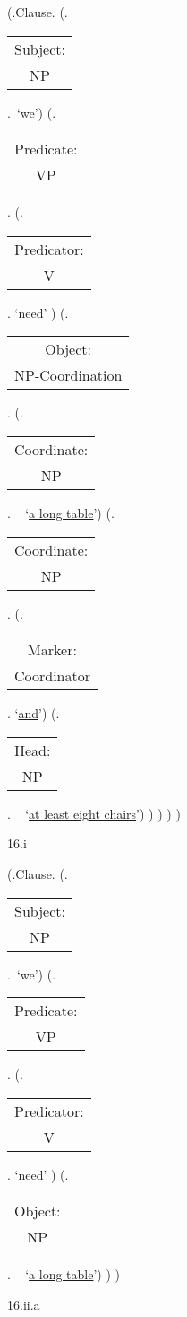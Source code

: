 \documentclass[12pt,letterpaper]{article}
\begin{document}
\begin{figure}
	\begin{center}
		\begin{parsetree}
			(.Clause.
			(.\begin{tabular}{c}Subject:\\NP\end{tabular}.~`we')
			(.\begin{tabular}{c}Predicate:\\VP\end{tabular}.
			(.\begin{tabular}{c}Predicator:\\V\end{tabular}. `need' )
			(.\begin{tabular}{c}Object:\\NP-Coordination\end{tabular}.
			(.\begin{tabular}{c}Coordinate:\\NP\end{tabular}.  ~ `\underline{a long table}')
			(.\begin{tabular}{c}Coordinate:\\NP\end{tabular}. 
			(.\begin{tabular}{c}Marker:\\Coordinator\end{tabular}.  `\underline{and}')
			(.\begin{tabular}{c}Head:\\NP\end{tabular}.  ~ `\underline{at least eight chairs}')
			)
			)
			)
			)
			
			\hfill \break\hfill \break
		\end{parsetree}
		16.i
	\end{center}
\end{figure}

\begin{figure}
	\begin{center}
		\begin{parsetree}
			(.Clause.
			(.\begin{tabular}{c}Subject:\\NP\end{tabular}.~`we')
			(.\begin{tabular}{c}Predicate:\\VP\end{tabular}.
			(.\begin{tabular}{c}Predicator:\\V\end{tabular}. `need' )
			(.\begin{tabular}{c}Object:\\NP\end{tabular}.  ~ `\underline{a long table}')
			)
			)
			
			\hfill \break\hfill \break
		\end{parsetree}
		16.ii.a
	\end{center}
\end{figure}
\end{document}
